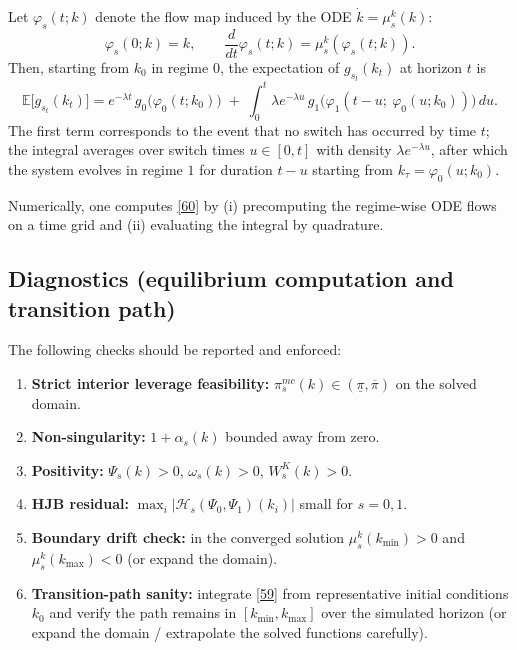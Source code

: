 \documentclass{article}
\begin{document}
Let $\varphi_s(t;k)$ denote the flow map induced by the ODE $\dot k=\mu^k_s(k)$:
\[
\varphi_s(0;k)=k,
\qquad
\frac{d}{dt}\varphi_s(t;k)=\mu^k_s(\varphi_s(t;k)).
\]
Then, starting from $k_0$ in regime $0$, the expectation of $g_{s_t}(k_t)$ at horizon $t$ is
\begin{equation}
\mathbb E\big[g_{s_t}(k_t)\big]
=
e^{-\lambda t}\, g_0\!\big(\varphi_0(t;k_0)\big)
\;+\;
\int_0^t \lambda e^{-\lambda u}\,
g_1\!\Big(\varphi_1(t-u;\ \varphi_0(u;k_0))\Big)\,du.
\tag{60}
\end{equation}
The first term corresponds to the event that no switch has occurred by time $t$; the integral averages
over switch times $u\in[0,t]$ with density $\lambda e^{-\lambda u}$, after which the system evolves in
regime $1$ for duration $t-u$ starting from $k_\tau=\varphi_0(u;k_0)$.

Numerically, one computes \eqref{60} by (i) precomputing the regime-wise ODE flows on a time grid and
(ii) evaluating the integral by quadrature.

\subsection{Diagnostics (equilibrium computation and transition path)}
The following checks should be reported and enforced:
\begin{enumerate}
\item \textbf{Strict interior leverage feasibility:} $\pi^{mc}_s(k)\in(\underline\pi,\overline\pi)$ on the solved domain.
\item \textbf{Non-singularity:} $1+\alpha_s(k)$ bounded away from zero.
\item \textbf{Positivity:} $\Psi_s(k)>0$, $\omega_s(k)>0$, $W^K_s(k)>0$.
\item \textbf{HJB residual:} $\max_i|\mathcal{H}_s(\Psi_0,\Psi_1)(k_i)|$ small for $s=0,1$.
\item \textbf{Boundary drift check:} in the converged solution $\mu^k_s(k_{\min})>0$ and $\mu^k_s(k_{\max})<0$ (or expand the domain).
\item \textbf{Transition-path sanity:} integrate \eqref{59} from representative initial conditions $k_0$ and verify the path remains in $[k_{\min},k_{\max}]$ over the simulated horizon (or expand the domain / extrapolate the solved functions carefully).
\end{enumerate}

\end{document}
